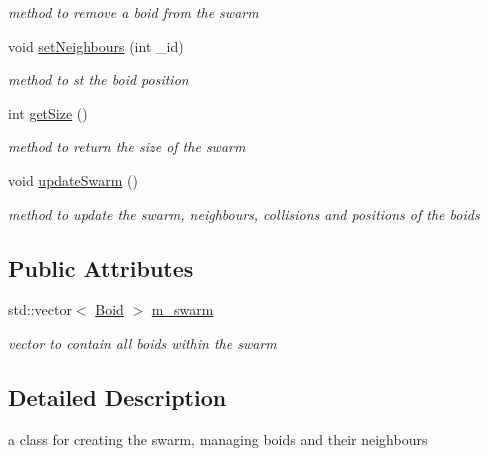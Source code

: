\begin{DoxyCompactItemize}
\begin{DoxyCompactList}\small\item\em method to remove a boid from the swarm \end{DoxyCompactList}\item 
void \hyperlink{classSwarm_a2edf4a7143b520b4390e2f7fe948c843}{set\-Neighbours} (int \-\_\-id)
\begin{DoxyCompactList}\small\item\em method to st the boid position \end{DoxyCompactList}\item 
\hypertarget{classSwarm_a21bce2e4048f0ed95f91544069d4a009}{int \hyperlink{classSwarm_a21bce2e4048f0ed95f91544069d4a009}{get\-Size} ()}\label{classSwarm_a21bce2e4048f0ed95f91544069d4a009}

\begin{DoxyCompactList}\small\item\em method to return the size of the swarm \end{DoxyCompactList}\item 
\hypertarget{classSwarm_adae7b2b5b76d18fe5c3d3118515b48c9}{void \hyperlink{classSwarm_adae7b2b5b76d18fe5c3d3118515b48c9}{update\-Swarm} ()}\label{classSwarm_adae7b2b5b76d18fe5c3d3118515b48c9}

\begin{DoxyCompactList}\small\item\em method to update the swarm, neighbours, collisions and positions of the boids \end{DoxyCompactList}\end{DoxyCompactItemize}
\subsection*{Public Attributes}
\begin{DoxyCompactItemize}
\item 
\hypertarget{classSwarm_a43829aa093ffd59ebc2c759667674428}{std\-::vector$<$ \hyperlink{classBoid}{Boid} $>$ \hyperlink{classSwarm_a43829aa093ffd59ebc2c759667674428}{m\-\_\-swarm}}\label{classSwarm_a43829aa093ffd59ebc2c759667674428}

\begin{DoxyCompactList}\small\item\em vector to contain all boids within the swarm \end{DoxyCompactList}\end{DoxyCompactItemize}


\subsection{Detailed Description}
a class for creating the swarm, managing boids and their neighbours 

